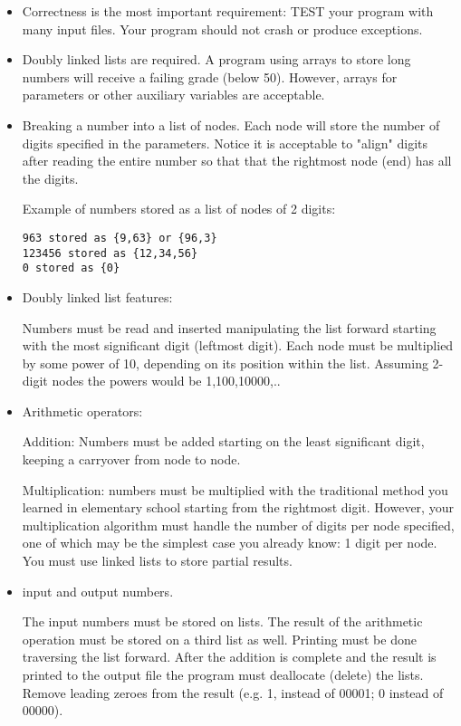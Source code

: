 \begin{itemize}
\item Correctness is the most important requirement: TEST
 your program with many input files.
 Your program should not crash or produce exceptions.

\item Doubly linked lists are required. A program using
arrays to store long numbers will receive a failing grade (below 50).
However, arrays for parameters or other auxiliary variables are acceptable.

\item Breaking a number into a list of nodes. Each node will store the number of digits specified in
the parameters. Notice it is acceptable to "align" digits after reading the entire number so 
that that the rightmost node (end) has all the digits.

Example of numbers stored as a list of nodes of 2 digits:
\begin{verbatim}
963 stored as {9,63} or {96,3}
123456 stored as {12,34,56}
0 stored as {0}
\end{verbatim}


\item Doubly linked list features:

Numbers must be read and inserted manipulating the list forward
starting with the most significant digit (leftmost digit).
Each node must be multiplied by some power of 10, depending on its
position within the list. Assuming 2-digit nodes the powers
would be 1,100,10000,..

\item Arithmetic operators:

Addition: Numbers must be added  starting on the least significant digit,
keeping a carryover from node to node.

Multiplication: numbers must be multiplied with the traditional method you learned
in elementary school starting from the rightmost digit. 
However, your multiplication
algorithm must handle the number of digits per node specified,
one of which may be the simplest case you already know: 1 digit per node.
You must use linked lists to store partial results.

\item input and output numbers.

The input numbers must be stored on lists.
The result of the arithmetic operation must be stored on a third list as well.
Printing must be done traversing the list forward.
After the addition is complete and the result is printed
to the output file the program must deallocate
(delete) the lists.
Remove leading zeroes from the result (e.g. 1, instead of 00001; 0 instead of 00000).


\end{itemize}
